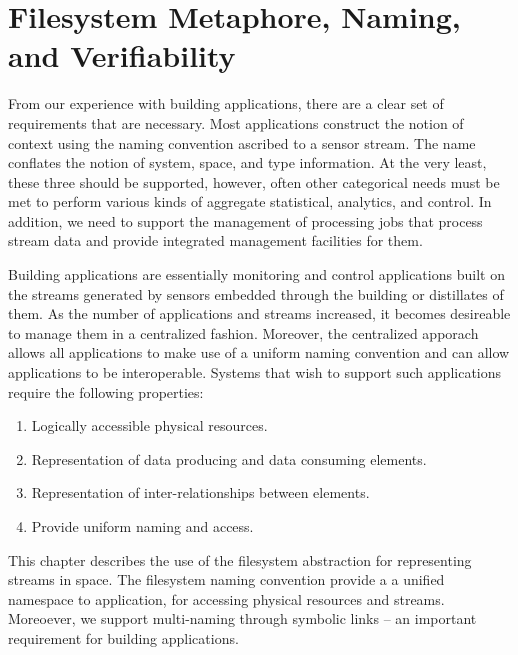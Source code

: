 \chapter{Filesystem Metaphore, Naming, and Verifiability}
\label{chap:naming}

From our experience with building applications, there are a clear set of requirements that are necessary.  Most applications
construct the notion of context using the naming convention ascribed to a sensor stream.  The name conflates the notion of system,
space, and type information.  At the very least, these three should be supported, however, often other categorical needs must be
met to perform various kinds of aggregate statistical, analytics, and control.  In addition, we need to support the management of
processing jobs that process stream data and provide integrated management facilities for them.

Building applications are essentially monitoring and control applications built on the streams generated by sensors embedded through
the building or distillates of them.  As the number of applications and streams increased, it becomes desireable to manage them 
in a centralized fashion.  Moreover, the centralized apporach allows all applications to make use of a uniform naming convention and
can allow applications to be interoperable.  Systems that wish to support such applications require the following properties:

\begin{enumerate}
\item Logically accessible physical resources.
\item Representation of data producing and data consuming elements.
\item Representation of inter-relationships between elements.
\item Provide uniform naming and access.
\end{enumerate}

This chapter describes the use of the filesystem abstraction for representing streams in space.  The filesystem naming convention
provide a a unified namespace to application, for accessing physical resources and streams.  Moreoever, we support multi-naming through
symbolic links -- an important requirement for building applications.  









